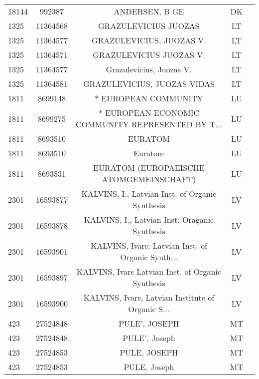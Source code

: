 \begin{longtable}{|l|c|c|c|c|}
     18144 &     992387 &                                     ANDERSEN, B GE &      DK \\
      1325 &   11364568 &                               GRAZULEVICIUS JUOZAS &      LT \\
      1325 &   11364577 &                           GRAZULEVICIUS, JUOZAS V. &      LT \\
      1325 &   11364571 &                            GRAZULEVICIUS JUOZAS V. &      LT \\
      1325 &   11364577 &                           Grazulevicius, Juozas V. &      LT \\
      1325 &   11364581 &                        GRAZULEVICIUS, JUOZAS VIDAS &      LT \\
      1811 &    8699148 &                               * EUROPEAN COMMUNITY &      LU \\
      1811 &    8699275 &  * EUROPEAN ECONOMIC COMMUNITY REPRESENTED BY T... &      LU \\
      1811 &    8693510 &                                            EURATOM &      LU \\
      1811 &    8693510 &                                            Euratom &      LU \\
      1811 &    8693531 &            EURATOM (EUROPAEISCHE ATOMGEMEINSCHAFT) &      LU \\
      2301 &   16593877 &    KALVINS, I., Latvian Inst. of Organic Synthesis &      LV \\
      2301 &   16593878 &      KALVINS, I., Latvian Inst. Oraganic Synthesis &      LV \\
      2301 &   16593901 &  KALVINS, Ivars; Latvian Inst. of Organic Synth... &      LV \\
      2301 &   16593897 &  KALVINS, Ivars Latvian Inst. of Organic Synthesis &      LV \\
      2301 &   16593900 &  KALVINS, Ivars, Latvian Institute of Organic S... &      LV \\
       423 &   27524848 &                                      PULE', JOSEPH &      MT \\
       423 &   27524848 &                                      PULE', Joseph &      MT \\
       423 &   27524853 &                                       PULE, JOSEPH &      MT \\
       423 &   27524853 &                                       PULE, Joseph &      MT \\

\end{longtable}

